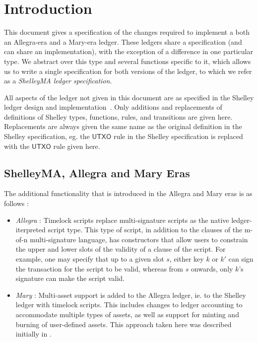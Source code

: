 \section{Introduction}

This document gives a specification of the changes
required to implement a both an Allegra-era and a Mary-era ledger. These ledgers share
a specification (and can share an implementation), with the exception of
a difference in one particular type. We abstract over this type and several
functions specific to it, which allows us to write a single specification for both versions of the
ledger, to which we refer as a \emph{ShelleyMA ledger specification}.

All aspects of the ledger not given in this document are as specified
in the Shelley ledger design and implementation~\cite{shelley_spec}.
Only additions and replacements of definitions of Shelley types, functions, rules, and transitions
are given here. Replacements are always given the same name as the
original definition in the Shelley specification, eg. the $\mathsf{UTXO}$ rule in the
Shelley specification is replaced with the $\mathsf{UTXO}$ rule given here.

\subsection{ShelleyMA, Allegra and Mary Eras}

The additional functionality that is introduced in the Allegra and Mary eras
is as follows :

\begin{itemize}
  \item \emph{Allegra} : Timelock scripts replace multi-signature scripts as the native
  ledger-iterpreted script type. This type of script, in addition to the
  clauses of the m-of-n multi-signature language, has constructors that
  allow users to constrain the upper and lower slots of the validity of a
  clause of the script. For example, one may specify that up to a given slot $s$,
  either key $k$ or $k'$ can sign the transaction for the script to be valid,
  whereas from $s$ onwards, only $k$'s signature can make the script valid.

  \item \emph{Mary} : Multi-asset support is added to the Allegra ledger, ie.
  to the Shelley ledger with timelock scripts. This includes changes to
  ledger accounting to accommodate multiple types of assets, as well as
  support for minting and burning of user-defined assets. This approach
  taken here was described initially in \cite{utxo_ma}.
\end{itemize}

